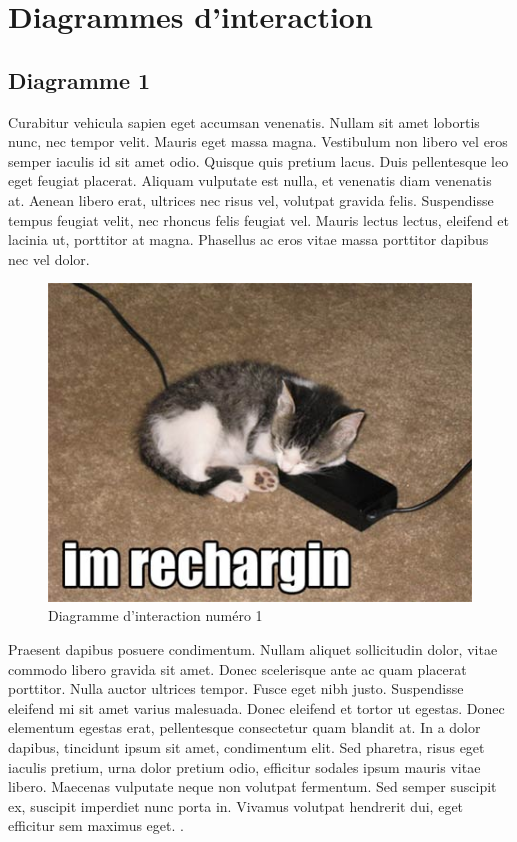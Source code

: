\section{Diagrammes d'interaction}

	\subsection{Diagramme 1}
	Curabitur vehicula sapien eget accumsan venenatis. Nullam sit amet lobortis nunc, nec tempor velit. Mauris eget massa magna. Vestibulum non libero vel eros semper iaculis id sit amet odio. Quisque quis pretium lacus. Duis pellentesque leo eget feugiat placerat. Aliquam vulputate est nulla, et venenatis diam venenatis at. Aenean libero erat, ultrices nec risus vel, volutpat gravida felis. Suspendisse tempus feugiat velit, nec rhoncus felis feugiat vel. Mauris lectus lectus, eleifend et lacinia ut, porttitor at magna. Phasellus ac eros vitae massa porttitor dapibus nec vel dolor.


		\begin{figure}
			\begin{center}
				\includegraphics[width=1\textwidth]{figure/interec1.jpg}
			\end{center}
			\caption{Diagramme d'interaction numéro 1}
			\label{fig:use1}
		\end{figure}

	Praesent dapibus posuere condimentum. Nullam aliquet sollicitudin dolor, vitae commodo libero gravida sit amet. Donec scelerisque ante ac quam placerat porttitor. Nulla auctor ultrices tempor. Fusce eget nibh justo. Suspendisse eleifend mi sit amet varius malesuada. Donec eleifend et tortor ut egestas. Donec elementum egestas erat, pellentesque consectetur quam blandit at. In a dolor dapibus, tincidunt ipsum sit amet, condimentum elit. Sed pharetra, risus eget iaculis pretium, urna dolor pretium odio, efficitur sodales ipsum mauris vitae libero. Maecenas vulputate neque non volutpat fermentum. Sed semper suscipit ex, suscipit imperdiet nunc porta in. Vivamus volutpat hendrerit dui, eget efficitur sem maximus eget.
	.

